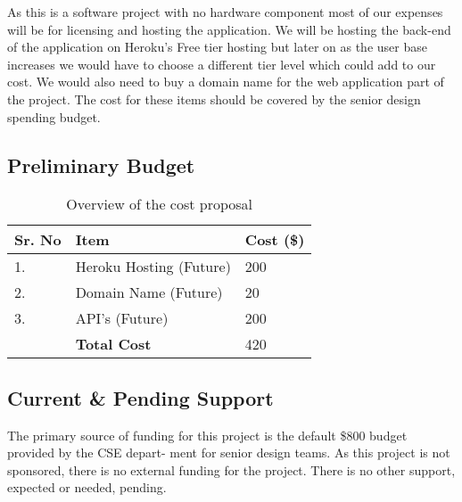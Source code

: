 As this is a software project with no hardware component most of our expenses will be for licensing and hosting the application. We will be hosting the back-end of the application on Heroku's Free tier hosting but later on as the user base increases we would have to choose a different tier level which could add to our cost. We would also need to buy a domain name for the web application part of the project. The cost for these items should be covered by the senior design spending budget. 
 

\subsection{Preliminary Budget}
\begin{table}[h]
\centering

\begin{tabular}{|l|l|l|} 
\hline
Sr. No & Item               & Cost (\$)  \\ 
\hline
1.     & Heroku Hosting (Future)    & 200        \\ 
\hline
2.     & Domain Name (Future)        & 20         \\ 
\hline
3.     & API's (Future)             & 200        \\
\hline
 & \textbf{Total Cost}              & 420        \\
\hline
\end{tabular}\caption{Overview of the cost proposal}
\end{table}

\subsection{Current \& Pending Support}
The primary source of funding for this project is the default \$800 budget provided by the CSE depart-
ment for senior design teams. As this project is not sponsored, there is no external funding for the
project. There is no other support, expected or needed, pending.